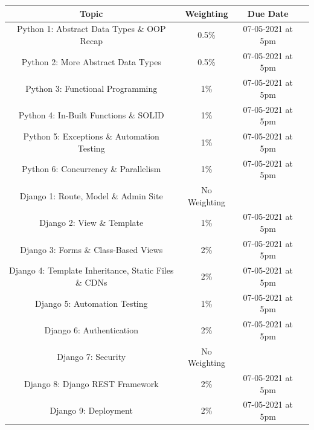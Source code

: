 \documentclass{article}
\begin{document}
\renewcommand{\arraystretch}{1.5}
\begin{tabular}{|c|c|c|c|} 
	\hline
	\textbf{Topic}                                              & \textbf{Weighting}  & \textbf{Due Date}        \\ \hline 
	\small Python 1: Abstract Data Types \& OOP Recap           & \small 0.5\%        & \small 07-05-2021 at 5pm \\ \hline
	\small Python 2: More Abstract Data Types                   & \small 0.5\%        & \small 07-05-2021 at 5pm \\ \hline
	\small Python 3: Functional Programming                     & \small 1\%          & \small 07-05-2021 at 5pm \\ \hline
	\small Python 4: In-Built Functions \& SOLID                & \small 1\%          & \small 07-05-2021 at 5pm \\ \hline
	\small Python 5: Exceptions \& Automation Testing           & \small 1\%          & \small 07-05-2021 at 5pm \\ \hline
	\small Python 6: Concurrency \& Parallelism                 & \small 1\%          & \small 07-05-2021 at 5pm \\ \hline
	\small Django 1: Route, Model \& Admin Site                 & \small No Weighting &                          \\ \hline
	\small Django 2: View \& Template                           & \small 1\%          & \small 07-05-2021 at 5pm \\ \hline
	\small Django 3: Forms \& Class-Based Views                 & \small 2\%          & \small 07-05-2021 at 5pm \\ \hline
	\small Django 4: Template Inheritance, Static Files \& CDNs & \small 2\%          & \small 07-05-2021 at 5pm \\ \hline
	\small Django 5: Automation Testing                         & \small 1\%          & \small 07-05-2021 at 5pm \\ \hline
	\small Django 6: Authentication                             & \small 2\%          & \small 07-05-2021 at 5pm \\ \hline
	\small Django 7: Security                                   & \small No Weighting &                          \\ \hline
	\small Django 8: Django REST Framework                      & \small 2\%          & \small 07-05-2021 at 5pm \\ \hline
	\small Django 9: Deployment                                 & \small 2\%          & \small 07-05-2021 at 5pm \\ \hline

\end{tabular}
\end{document}
